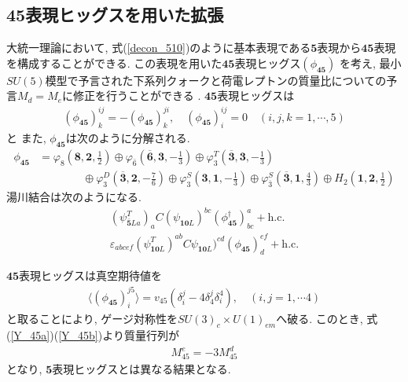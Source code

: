 \subsection{45表現ヒッグスを用いた拡張}
大統一理論において, 式(\ref{decon_510})のように基本表現である$\bm{5}$表現から$\bm{45}$表現を構成することができる.
この表現を用いた$\bm{45}$表現ヒッグス$(\phi_{\bm{45}})$ を考え, 
最小$SU(5)$模型で予言された下系列クォークと荷電レプトンの質量比についての予言$M_d = M_e$に修正を行うことができる
\cite{framptonEstimateFlavorNumber1979,georgiNewLeptonquarkMass1979}.
$\bm{45}$表現ヒッグスは
\begin{align}
  \left(\phi_{\bm{45}}\right)^{ij}_k = -(\phi_{\bm{45}})^{ji}_k,\quad (\phi_{\bm{45}})^{ij}_i =0 \quad(i,j,k =1,\cdots,5)\nonumber
\end{align}
と
また, $\phi_{\bm{45}}$は次のように分解される.
\begin{align}
  \phi_{\bm{45}} &= \varphi_8 \left(\bm{8}, \bm{2}, \frac{1}{2}\right) \oplus \varphi_{\bar{6}}\left(\overline{\bm{6}}, \bm{3}, -\frac{1}{3}\right) \oplus \varphi_3^T\left(\overline{\bm{3}}, \bm{3}, -\frac{1}{3}\right) \nonumber\\
                 &\qquad\qquad\oplus \varphi_3^D\left( \overline{\bm{3}}, \bm{2}, -\frac{7}{6}\right) \oplus \varphi_3^S\left(\bm{3}, \bm{1}, -\frac{1}{3}\right)\oplus \varphi_{\overline{3}}^S\left( \overline{\bm{3}}, \bm{1}, \frac{4}{3}\right)\oplus H_2\left(\bm{1}, \bm{2}, \frac{1}{2}\right)\nonumber
\end{align}
湯川結合は次のようになる.
\begin{align}
  (\psi_{\bm{\bar{5}}La}^T)_a C (\psi_{\bm{10}L})^{bc} (\phi_{\bm{45}}^\dagger)_{bc}^a+\mathrm{h.c.}\label{Y_45a}\\
  \varepsilon_{abcef} (\psi_{\bm{10}L}^T)^{ab} C \psi_{\bm{10}L})^{cd} (\phi_{\bm{45}})_d^{ef}+ \mathrm{h.c.}\label{Y_45b}
\end{align}

$\bm{45}$表現ヒッグスは真空期待値を
\begin{align}
  \langle (\phi_{\bm{45}})^{j5}_i\rangle = v_{45}\left(\delta^j_i - 4\delta^j_4 \delta_i^4\right),\quad(i,j=1,\cdots 4)
\end{align}
と取ることにより, ゲージ対称性を$SU(3)_c\times U(1)_{em}$へ破る.
このとき, 式(\ref{Y_45a})(\ref{Y_45b})より質量行列が
\begin{align}
  M^e_{45} = -3M_{45}^d
\end{align}
となり, $\bm{5}$表現ヒッグスとは異なる結果となる.

